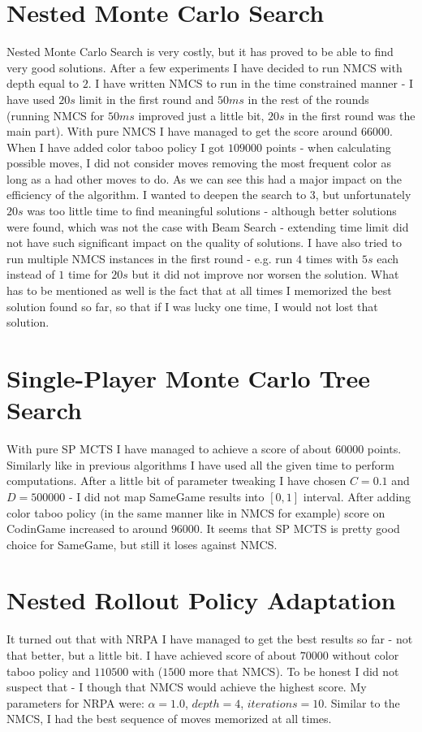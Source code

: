 \documentclass[11pt]{article}
\begin{document}
	\section{Nested Monte Carlo Search}
	Nested Monte Carlo Search is very costly, but it has proved to be able to find very good solutions. After a few experiments I have decided to run NMCS with depth equal to $2$. I have written NMCS to run in the time constrained manner - I have used $20s$ limit in the first round and $50ms$ in the rest of the rounds (running NMCS for $50ms$ improved just a little bit, $20s$ in the first round was the main part). With pure NMCS I have managed to get the score around $66000$. When I have added color taboo policy I got $109000$ points - when calculating possible moves, I did not consider moves removing the most frequent color as long as a had other moves to do. As we can see this had a major impact on the efficiency of the algorithm. I wanted to deepen the search to $3$, but unfortunately $20s$ was too little time to find meaningful solutions - although better solutions were found, which was not the case with Beam Search - extending time limit did not have such significant impact on the quality of solutions. I have also tried to run multiple NMCS instances in the first round - e.g. run $4$ times with $5s$ each instead of $1$ time for $20s$ but it did not improve nor worsen the solution. What has to be mentioned as well is the fact that at all times I memorized the best solution found so far, so that if I was lucky one time, I would not lost that solution.
	
	\section{Single-Player Monte Carlo Tree Search}
	With pure SP MCTS I have managed to achieve a score of about $60000$ points. Similarly like in previous algorithms I have used all the given time to perform computations. After a little bit of parameter tweaking I have chosen $C=0.1$ and $D=500000$ - I did not map SameGame results into $[0,1]$ interval. After adding color taboo policy (in the same manner like in NMCS for example) score on CodinGame increased to around $96000$. It seems that SP MCTS is pretty good choice for SameGame, but still it loses against NMCS.
	
	\section{Nested Rollout Policy Adaptation}
	It turned out that with NRPA I have managed to get the best results so far - not that better, but a little bit. I have achieved score of about $70000$ without color taboo policy and $110500$ with ($1500$ more that NMCS). To be honest I did not suspect that - I though that NMCS would achieve the highest score. My parameters for NRPA were: $\alpha=1.0$, $depth=4$, $iterations=10$. Similar to the NMCS, I had the best sequence of moves memorized at all times.
	
\end{document}
